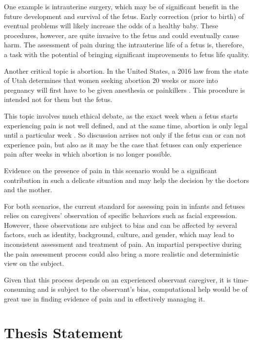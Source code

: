 One example is intrauterine surgery, which may be of significant benefit in the future development and survival of the fetus. Early correction (prior to birth) of eventual problems will likely increase the odds of a healthy baby. These procedures, however, are quite invasive to the fetus and could eventually cause harm. The assessment of pain during the intrauterine life of a fetus is, therefore, a task with the potential of bringing significant improvements to fetus life quality. 

Another critical topic is abortion. In the United States, a 2016 law from the state of Utah determines that women seeking abortion 20 weeks or more into pregnancy will first have to be given anesthesia or painkillers \citep{healy2016nytimes}. This procedure is intended not for them but the fetus. 

This topic involves much ethical debate, as the exact week when a fetus starts experiencing pain is not well defined, and at the same time, abortion is only legal until a particular week \citep{Derbyshire2006}. So discussion arrises not only if the fetus can or can not experience pain, but also as it may be the case that fetuses can only experience pain after weeks in which abortion is no longer possible.


Evidence on the presence of pain in this scenario would be a significant contribution in such a delicate situation and may help the decision by the doctors and the mother.

For both scenarios, the current standard for assessing pain in infants and fetuses relies on caregivers' observation of specific behaviors such as facial expression. However, these observations are subject to bias and can be affected by several factors, such as identity, background, culture, and gender, which may lead to inconsistent assessment and treatment of pain. An impartial perspective during the pain assessment process could also bring a more realistic and deterministic view on the subject.

Given that this process depends on an experienced observant caregiver, it is time-consuming and is subject to the observant's bias, computational help would be of great use in finding evidence of pain and in effectively managing it.

\section{Thesis Statement}

